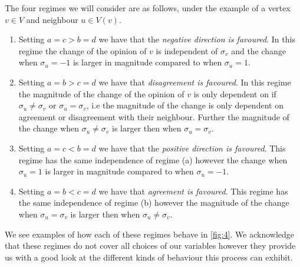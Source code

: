 The four regimes we will consider are as follows, under the example of a vertex \(v\in V\) and neighbour \(u\in V(v)\).
\begin{enumerate}[label=(\alph*)]
	\item Setting \(a=c > b=d\) we have that the \emph{negative direction is favoured}. 
	In this regime the change of the opinion of \(v\) is independent of \(\sigma_v\) and the change when \(\sigma_u=-1\) is larger in magnitude compared to when \(\sigma_u=1\).
\item Setting \(a=b>c=d\) we have that \emph{disagreement is favoured}.
		In this regime the magnitude of the change of the opinion of \(v\) is only dependent on if \(\sigma_u\ne \sigma_v\) or \(\sigma_u=\sigma_v\), i.e the magnitude of the change is only dependent on agreement or disagreement with their neighbour.
		Further the magnitude of the change when \(\sigma_u\ne \sigma_v\) is larger then when \(\sigma_u=\sigma_v\).
	\item Setting \(a=c<b=d\) we have that the \emph{positive direction is favoured}.
		This regime has the same independence of regime (a) however the change when \(\sigma_u=1\) is larger in magnitude compared to when \(\sigma_u=-1\).
	\item Setting \(a=b<c=d\) we have that \emph{agreement is favoured}.
		This regime has the same independence of regime (b) however the magnitude of the change when \(\sigma_u=\sigma_v\) is larger then when \(\sigma_u\ne \sigma_v\).
\end{enumerate}
We see examples of how each of these regimes behave in \cref{fig:4}.
We acknowledge that these regimes do not cover all choices of our variables however they provide us with a good look at the different kinds of behaviour this process can exhibit.

